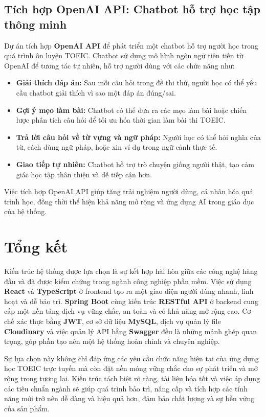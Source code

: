 \documentclass[../DoAn.tex]{subfiles}
\begin{document}
\subsection{Tích hợp OpenAI API: Chatbot hỗ trợ học tập thông minh}

Dự án tích hợp \textbf{OpenAI API} để phát triển một chatbot hỗ trợ người học trong quá trình ôn luyện TOEIC. Chatbot sử dụng mô hình ngôn ngữ tiên tiến từ OpenAI để tương tác tự nhiên, hỗ trợ người dùng với các chức năng như:

\begin{itemize}
    \item \textbf{Giải thích đáp án:} Sau mỗi câu hỏi trong đề thi thử, người học có thể yêu cầu chatbot giải thích vì sao một đáp án đúng/sai.
    \item \textbf{Gợi ý mẹo làm bài:} Chatbot có thể đưa ra các mẹo làm bài hoặc chiến lược phân tích câu hỏi để tối ưu hóa thời gian làm bài thi TOEIC.
    \item \textbf{Trả lời câu hỏi về từ vựng và ngữ pháp:} Người học có thể hỏi nghĩa của từ, cách dùng ngữ pháp, hoặc xin ví dụ trong ngữ cảnh thực tế.
    \item \textbf{Giao tiếp tự nhiên:} Chatbot hỗ trợ trò chuyện giống người thật, tạo cảm giác học tập thân thiện và dễ tiếp cận hơn.
\end{itemize}

Việc tích hợp OpenAI API giúp tăng trải nghiệm người dùng, cá nhân hóa quá trình học, đồng thời thể hiện khả năng mở rộng và ứng dụng AI trong giáo dục của hệ thống.

\section{Tổng kết}

Kiến trúc hệ thống được lựa chọn là sự kết hợp hài hòa giữa các công nghệ hàng đầu và đã được kiểm chứng trong ngành công nghiệp phần mềm. Việc sử dụng \textbf{React} và \textbf{TypeScript} ở frontend tạo ra một giao diện người dùng nhanh, linh hoạt và dễ bảo trì. \textbf{Spring Boot} cùng kiến trúc \textbf{RESTful API} ở backend cung cấp một nền tảng dịch vụ vững chắc, an toàn và có khả năng mở rộng cao. Cơ chế xác thực bằng \textbf{JWT}, cơ sở dữ liệu \textbf{MySQL}, dịch vụ quản lý file \textbf{Cloudinary} và việc quản lý API bằng \textbf{Swagger} đều là những mảnh ghép quan trọng, góp phần tạo nên một hệ thống hoàn chỉnh và chuyên nghiệp.

Sự lựa chọn này không chỉ đáp ứng các yêu cầu chức năng hiện tại của ứng dụng học TOEIC trực tuyến mà còn đặt nền móng vững chắc cho sự phát triển và mở rộng trong tương lai. Kiến trúc tách biệt rõ ràng, tài liệu hóa tốt và việc áp dụng các tiêu chuẩn ngành sẽ giúp quá trình bảo trì, nâng cấp và tích hợp các tính năng mới trở nên dễ dàng và hiệu quả hơn, đảm bảo chất lượng và sự bền vững của sản phẩm.
\end{document}
